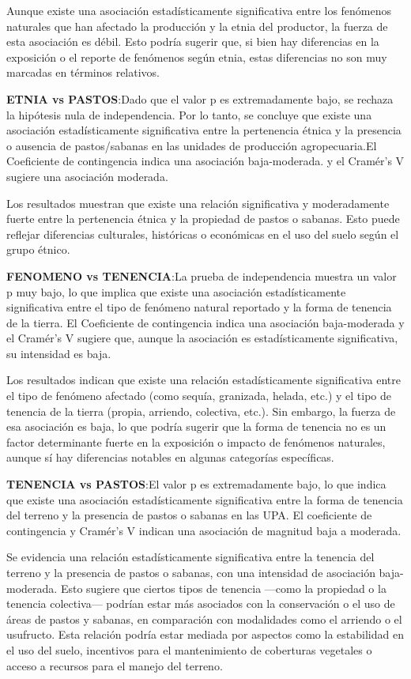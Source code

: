 \documentclass[]{tufte-handout}
\begin{document}
Aunque existe una asociación estadísticamente significativa entre los
fenómenos naturales que han afectado la producción y la etnia del
productor, la fuerza de esta asociación es débil. Esto podría sugerir
que, si bien hay diferencias en la exposición o el reporte de fenómenos
según etnia, estas diferencias no son muy marcadas en términos
relativos.

\textbf{ETNIA vs PASTOS}:Dado que el valor p es extremadamente bajo, se
rechaza la hipótesis nula de independencia. Por lo tanto, se concluye
que existe una asociación estadísticamente significativa entre la
pertenencia étnica y la presencia o ausencia de pastos/sabanas en las
unidades de producción agropecuaria.El Coeficiente de contingencia
indica una asociación baja-moderada. y el Cramér's V sugiere una
asociación moderada.

Los resultados muestran que existe una relación significativa y
moderadamente fuerte entre la pertenencia étnica y la propiedad de
pastos o sabanas. Esto puede reflejar diferencias culturales, históricas
o económicas en el uso del suelo según el grupo étnico.

\textbf{FENOMENO vs TENENCIA}:La prueba de independencia muestra un
valor p muy bajo, lo que implica que existe una asociación
estadísticamente significativa entre el tipo de fenómeno natural
reportado y la forma de tenencia de la tierra. El Coeficiente de
contingencia indica una asociación baja-moderada y el Cramér's V sugiere
que, aunque la asociación es estadísticamente significativa, su
intensidad es baja.

Los resultados indican que existe una relación estadísticamente
significativa entre el tipo de fenómeno afectado (como sequía,
granizada, helada, etc.) y el tipo de tenencia de la tierra (propia,
arriendo, colectiva, etc.). Sin embargo, la fuerza de esa asociación es
baja, lo que podría sugerir que la forma de tenencia no es un factor
determinante fuerte en la exposición o impacto de fenómenos naturales,
aunque sí hay diferencias notables en algunas categorías específicas.

\textbf{TENENCIA vs PASTOS}:El valor p es extremadamente bajo, lo que
indica que existe una asociación estadísticamente significativa entre la
forma de tenencia del terreno y la presencia de pastos o sabanas en las
UPA. El coeficiente de contingencia y Cramér's V indican una asociación
de magnitud baja a moderada.

Se evidencia una relación estadísticamente significativa entre la
tenencia del terreno y la presencia de pastos o sabanas, con una
intensidad de asociación baja-moderada. Esto sugiere que ciertos tipos
de tenencia ---como la propiedad o la tenencia colectiva--- podrían
estar más asociados con la conservación o el uso de áreas de pastos y
sabanas, en comparación con modalidades como el arriendo o el usufructo.
Esta relación podría estar mediada por aspectos como la estabilidad en
el uso del suelo, incentivos para el mantenimiento de coberturas
vegetales o acceso a recursos para el manejo del terreno.
\end{document}
